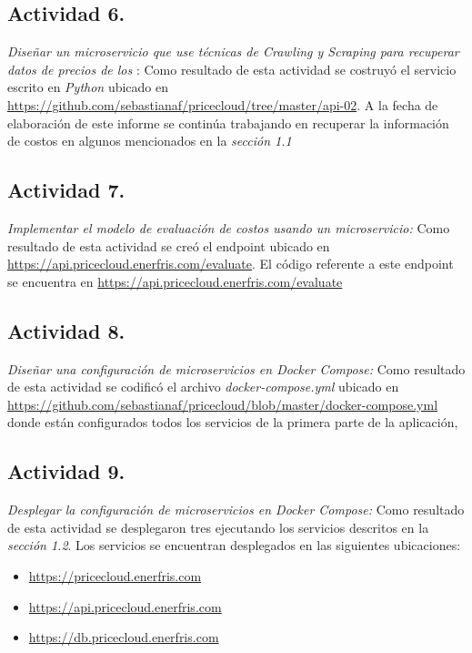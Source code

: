 \subsection{Actividad 6.}
\emph{Diseñar un microservicio que use técnicas de \emph{Crawling} y \emph{Scraping} para recuperar datos de precios de los }:
\newline\newline
Como resultado de esta actividad se costruyó el servicio escrito en \emph{Python} ubicado en \url{https://github.com/sebastianaf/pricecloud/tree/master/api-02}. A la fecha de elaboración de este informe se continúa trabajando en recuperar la información de costos en algunos  mencionados en la \emph{sección 1.1}

\subsection{Actividad 7.}
\emph{Implementar el modelo de evaluación de costos usando un microservicio:}\newline\newline
Como resultado de esta actividad se creó el endpoint ubicado en \url{https://api.pricecloud.enerfris.com/evaluate}. El código referente a este endpoint se encuentra en \url{https://api.pricecloud.enerfris.com/evaluate}

\subsection{Actividad 8.}
\emph{Diseñar una configuración de microservicios en \gls{Docker Compose}:}
\newline\newline
 Como resultado de esta actividad se codificó el archivo \emph{docker-compose.yml} ubicado en \url{https://github.com/sebastianaf/pricecloud/blob/master/docker-compose.yml} donde están configurados todos los servicios de la primera parte de la aplicación,

\subsection{Actividad 9.}
\emph{Desplegar la configuración de microservicios en \gls{Docker Compose}:}
\newline\newline
Como resultado de esta actividad se desplegaron tres  ejecutando los servicios descritos en la \emph{sección 1.2}.
\newline\newline
Los servicios se encuentran desplegados en las siguientes ubicaciones:
\begin{itemize}
    \item \url{https://pricecloud.enerfris.com}
    \item \url{https://api.pricecloud.enerfris.com}
    \item \url{https://db.pricecloud.enerfris.com}
\end{itemize}


\newpage

